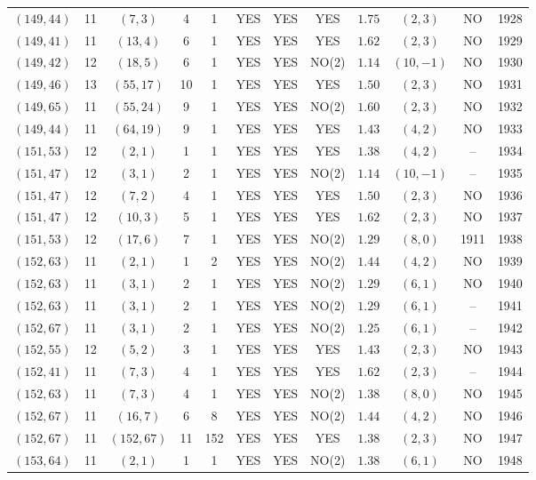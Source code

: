 \begin{longtable}{|c|c|c|c|c|c|c|c|c|c|c|c|}
$(149,44)$ & 11 & $(7,3)$ & 4 & 1 & YES & YES & YES & $1.75$ & $(2,3)$ & NO & 1928\\
$(149,41)$ & 11 & $(13,4)$ & 6 & 1 & YES & YES & YES & $1.62$ & $(2,3)$ & NO & 1929\\
$(149,42)$ & 12 & $(18,5)$ & 6 & 1 & YES & YES & NO(2) & $1.14$ & $(10,-1)$ & NO & 1930\\
$(149,46)$ & 13 & $(55,17)$ & 10 & 1 & YES & YES & YES & $1.50$ & $(2,3)$ & NO & 1931\\
$(149,65)$ & 11 & $(55,24)$ & 9 & 1 & YES & YES & NO(2) & $1.60$ & $(2,3)$ & NO & 1932\\
$(149,44)$ & 11 & $(64,19)$ & 9 & 1 & YES & YES & YES & $1.43$ & $(4,2)$ & NO & 1933\\
$(151,53)$ & 12 & $(2,1)$ & 1 & 1 & YES & YES & YES & $1.38$ & $(4,2)$ & -- & 1934\\
$(151,47)$ & 12 & $(3,1)$ & 2 & 1 & YES & YES & NO(2) & $1.14$ & $(10,-1)$ & -- & 1935\\
$(151,47)$ & 12 & $(7,2)$ & 4 & 1 & YES & YES & YES & $1.50$ & $(2,3)$ & NO & 1936\\
$(151,47)$ & 12 & $(10,3)$ & 5 & 1 & YES & YES & YES & $1.62$ & $(2,3)$ & NO & 1937\\
$(151,53)$ & 12 & $(17,6)$ & 7 & 1 & YES & YES & NO(2) & $1.29$ & $(8,0)$ & 1911 & 1938\\
$(152,63)$ & 11 & $(2,1)$ & 1 & 2 & YES & YES & NO(2) & $1.44$ & $(4,2)$ & NO & 1939\\
$(152,63)$ & 11 & $(3,1)$ & 2 & 1 & YES & YES & NO(2) & $1.29$ & $(6,1)$ & NO & 1940\\
$(152,63)$ & 11 & $(3,1)$ & 2 & 1 & YES & YES & NO(2) & $1.29$ & $(6,1)$ & -- & 1941\\
$(152,67)$ & 11 & $(3,1)$ & 2 & 1 & YES & YES & NO(2) & $1.25$ & $(6,1)$ & -- & 1942\\
$(152,55)$ & 12 & $(5,2)$ & 3 & 1 & YES & YES & YES & $1.43$ & $(2,3)$ & NO & 1943\\
$(152,41)$ & 11 & $(7,3)$ & 4 & 1 & YES & YES & YES & $1.62$ & $(2,3)$ & -- & 1944\\
$(152,63)$ & 11 & $(7,3)$ & 4 & 1 & YES & YES & NO(2) & $1.38$ & $(8,0)$ & NO & 1945\\
$(152,67)$ & 11 & $(16,7)$ & 6 & 8 & YES & YES & NO(2) & $1.44$ & $(4,2)$ & NO & 1946\\
$(152,67)$ & 11 & $(152,67)$ & 11 & 152 & YES & YES & YES & $1.38$ & $(2,3)$ & NO & 1947\\
$(153,64)$ & 11 & $(2,1)$ & 1 & 1 & YES & YES & NO(2) & $1.38$ & $(6,1)$ & NO & 1948\\

\end{longtable}
